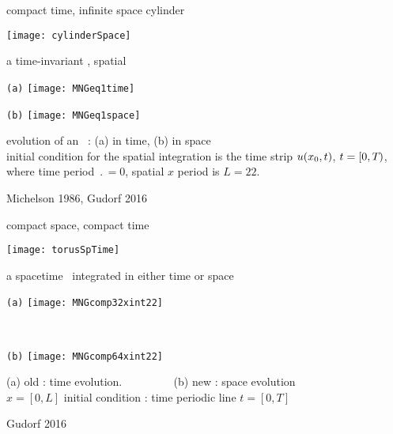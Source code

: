 \begin{frame}{compact time, infinite space cylinder}
\begin{center}
\texttt{[image: cylinderSpace]}
\end{center}
\end{frame}

\begin{frame}{a time-invariant \eqv, spatial \po}
\begin{center}
  \begin{minipage}[height=.45\textheight]{.45\textwidth}
    \centering \small{\texttt{(a)}}
    \texttt{[image: MNGeq1time]}
  \end{minipage}
  \begin{minipage}[height=.45\textheight]{.45\textwidth}
    \centering \small{\texttt{(b)}}
    \texttt{[image: MNGeq1space]}
  \end{minipage}
\end{center}
  evolution of an \eqv\ : (a) in time, (b) in space
   \\
   initial condition for the spatial integration is the time strip
   $u(x_0,t)$, $t = [0,{T_{}})$, where time period
   $\period{} =0$, spatial $x$ period is $L=22$.

\vfill\hfill        Michelson 1986, Gudorf 2016
\end{frame}

\begin{frame}{compact space, compact time}
\begin{center}
\texttt{[image: torusSpTime]}
\end{center}
\end{frame}

\begin{frame}{a spacetime \twot\ integrated in either time or space}
\begin{center}
  \begin{minipage}[height=.40\textheight]{.35\textwidth}
    \centering \small{\texttt{(a)}}
    \texttt{[image: MNGcomp32xint22]}
  \end{minipage}
~~~~~~~~~
  \begin{minipage}[height=.40\textheight]{.35\textwidth}
    \centering \small{\texttt{(b)}}
    \texttt{[image: MNGcomp64xint22]}
  \end{minipage}
\end{center}
    (a) old : time evolution. $\qquad\qquad$ (b) new : space evolution
    \\
    $x=[0,L]$ %
       initial condition : time periodic line $t = [0,T]$

\vfill\hfill        Gudorf 2016
\end{frame}

